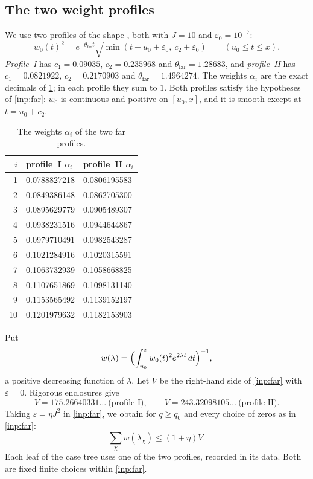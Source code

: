 \documentclass[11pt]{amsart}
\numberwithin{equation}{section}
\theoremstyle{plain}
\theoremstyle{definition}
\theoremstyle{remark}
\newcommand{\eps}{\varepsilon}
\newcommand{\1}{\mathbf{1}}
\begin{document}
\subsection{The two weight profiles}
We use two profiles of the shape \cite[(6.20)]{Xylouris2011nullstellen}, both with $J=10$ and
$\eps_0=10^{-7}$:
\[
  w_0(t)^2=e^{-\theta_{\mathrm{far}}t}\sqrt{\min(t-u_0+\eps_0,\ c_2+\eps_0)}\qquad(u_0\le t\le x).
\]
\emph{Profile~I} has $c_1=0.09035$, $c_2=0.235968$ and $\theta_{\mathrm{far}}=1.28683$, and
\emph{profile~II} has $c_1=0.0821922$, $c_2=0.2170903$ and $\theta_{\mathrm{far}}=1.4964274$. The weights
$\alpha_i$ are the exact decimals of \cref{tab:alpha}; in each profile they sum to $1$. Both
profiles satisfy the hypotheses of \cref{inp:far}: $w_0$ is continuous and positive on
$[u_0,x]$, and it is smooth except at $t=u_0+c_2$.

\begin{table}[ht]
\centering
\small
\begin{tabular}{rll}
\toprule
$i$ & profile~I $\alpha_i$ & profile~II $\alpha_i$ \\
\midrule
1 & 0.0788827218 & 0.0806195583 \\
2 & 0.0849386148 & 0.0862705300 \\
3 & 0.0895629779 & 0.0905489307 \\
4 & 0.0938231516 & 0.0944644867 \\
5 & 0.0979710491 & 0.0982543287 \\
6 & 0.1021284916 & 0.1020315591 \\
7 & 0.1063732939 & 0.1058668825 \\
8 & 0.1107651869 & 0.1098131140 \\
9 & 0.1153565492 & 0.1139152197 \\
10 & 0.1201979632 & 0.1182153903 \\
\bottomrule
\end{tabular}
\caption{The weights $\alpha_i$ of the two far profiles.}
\label{tab:alpha}
\end{table}

Put
\[
  w(\lambda)=\Bigl(\int_{u_0}^xw_0(t)^2e^{2\lambda t}\,dt\Bigr)^{-1},
\]
a positive decreasing function of $\lambda$. Let $V$ be the right-hand side of \cref{inp:far}
with $\eps=0$. Rigorous enclosures give
\[
  V=175.26640331\ldots\ \text{(profile I)},\qquad V=243.32098105\ldots\ \text{(profile II)}.
\]
Taking $\eps=\eta J^2$ in \cref{inp:far}, we obtain for $q\ge q_0$ and every choice of zeros as in
\cref{inp:far}:
\begin{equation}\label{eq:farbudget}
  \sum_\chi w(\lambda_\chi)\le(1+\eta)V .
\end{equation}
Each leaf of the case tree uses one of the two profiles, recorded in its data. Both
are fixed finite choices within \cref{inp:far}.
\end{document}
